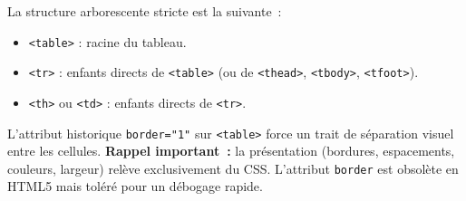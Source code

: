 \documentclass[11pt]{article}
\begin{document}
\begin{propriete}
La structure arborescente stricte est la suivante~:
\begin{itemize}
    \item \texttt{<table>} : racine du tableau.
    \item \texttt{<tr>} : enfants directs de \texttt{<table>} (ou de \texttt{<thead>}, \texttt{<tbody>}, \texttt{<tfoot>}).
    \item \texttt{<th>} ou \texttt{<td>} : enfants directs de \texttt{<tr>}.
\end{itemize}
L'attribut historique \texttt{border="1"} sur \texttt{<table>} force un trait de séparation visuel entre les cellules. \textbf{Rappel important~:} la présentation (bordures, espacements, couleurs, largeur) relève exclusivement du CSS. L'attribut \texttt{border} est obsolète en HTML5 mais toléré pour un débogage rapide.
\end{propriete}
\end{document}
